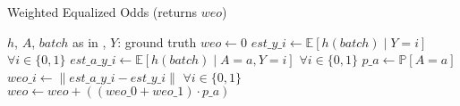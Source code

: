 \begin{algorithm}
    \caption{Weighted Equalized Odds (returns $weo$)}
    \label{alg:weo}
    \begin{algorithmic}[1]
        \Require $h$, $A$, $batch$ \hfill as in , \hfill $Y$: ground truth
        \State $weo \leftarrow 0$
        \State $est\_y\_i \leftarrow \mathbb{E}[h(batch) \mid Y = i]$ \hfill \(\forall i \in \{0, 1\}\)
            \State $est\_a\_y\_i \leftarrow \mathbb{E}[h(batch) \mid A = a, Y = i]$ \hfill \(\forall i \in \{0, 1\}\)
            \State $p\_a \leftarrow \mathbb{P}[A = a]$
            \State $weo\_i \leftarrow \| est\_a\_y\_i - est\_y\_i \|$ \hfill \(\forall i \in \{0, 1\}\)
            \State $weo \leftarrow weo + \left( (weo\_0 + weo\_1) \cdot p\_a \right)$
        \EndFor
    \end{algorithmic}
\end{algorithm}